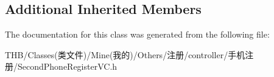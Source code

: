\subsection*{Additional Inherited Members}


The documentation for this class was generated from the following file\+:\begin{DoxyCompactItemize}
\item 
T\+H\+B/\+Classes(类文件)/\+Mine(我的)/\+Others/注册/controller/手机注册/Second\+Phone\+Register\+V\+C.\+h\end{DoxyCompactItemize}
